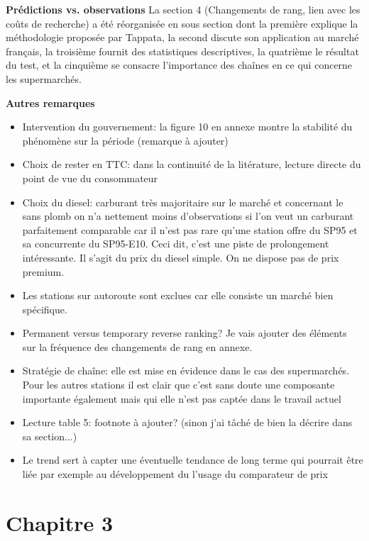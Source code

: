 \documentclass[11pt]{article}
\begin{document}
\medskip

\textbf{Prédictions vs. observations} La section 4 (Changements de rang, lien avec les coûts de recherche) a été réorganisée en sous section dont la première explique la méthodologie proposée par Tappata, la second discute son application au marché français, la troisième fournit des statistiques descriptives, la quatrième le résultat du test, et la cinquième se consacre l'importance des chaînes en ce qui concerne les supermarchés.

\medskip

\textbf{Autres remarques}
\begin{itemize}
\item Intervention du gouvernement: la figure 10 en annexe montre la stabilité du phénomène sur la période (remarque à ajouter)
\item Choix de rester en TTC: dans la continuité de la litérature, lecture directe du point de vue du consommateur
\item Choix du diesel: carburant très majoritaire sur le marché et concernant le sans plomb on n'a nettement moins d'observations si l'on veut un carburant parfaitement comparable car il n'est pas rare qu'une station offre du SP95 et sa concurrente du SP95-E10. Ceci dit, c'est une piste de prolongement intéressante. Il s'agit du prix du diesel simple. On ne dispose pas de prix premium.
\item Les stations sur autoroute sont exclues car elle consiste un marché bien spécifique.
\item Permanent versus temporary reverse ranking? Je vais ajouter des éléments sur la fréquence des changements de rang en annexe.
\item Stratégie de chaîne: elle est mise en évidence dans le cas des supermarchés. Pour les autres stations il est clair que c'est sans doute une composante importante également mais qui elle n'est pas captée dans le travail actuel
\item Lecture table 5: footnote à ajouter? (sinon j'ai tâché de bien la décrire dans sa section...)
\item Le trend sert à capter une éventuelle tendance de long terme qui pourrait être liée par exemple au développement du l'usage du comparateur de prix
\end{itemize}

\section{Chapitre 3}
\end{document}
